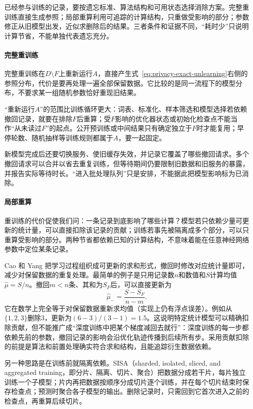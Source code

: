 已经参与训练的记录，要按遗忘标准、算法结构和可用状态选择消除方案。完整重训练直接生成参照；局部重算利用可追踪的计算结构，只重做受影响的部分；参数修正从旧模型出发，近似求删除后的结果。三者条件和证据不同，“耗时少”只说明计算节省，不能单独代表遗忘充分。

\paragraph{完整重训练}

完整重训练在$D\setminus F$上重新运行$A$，直接产生式~\eqref{eq:privacy-exact-unlearning}右侧的参照分布，代价是要再处理一遍全部保留数据。它比较的是同一流程下的模型分布，不要求某一组随机参数恰好重现旧结果。

“重新运行$A$”的范围比训练循环更大：词表、标准化、样本筛选和模型选择若依赖撤回记录，就要在排除$F$后重算；受$F$影响的优化器状态或初始化检查点不能当作“从未读过$F$”的起点。公开预训练或中间结果只有确定独立于$F$时才能复用；早停轮数、随机抽样等训练规则都属于$A$，要一起固定。

新模型完成后还要切换服务、使旧缓存失效，并记录它覆盖了哪些撤回请求。多个撤回请求可以合并以省去重复训练，但等待期间仍要限制旧数据和旧服务的暴露，并报告实际等待时长。“进入批处理队列”只是安排，不能据此把模型影响标为已消除。

\paragraph{局部重算}

重训练的代价促使我们问：一条记录到底影响了哪些计算？模型若只依赖少量可更新的统计量，可以直接扣除该记录的贡献；训练若事先被隔离成多个部分，可以只重算受影响的部分。两种节省都依赖已知的计算结构，不意味着能在任意神经网络参数中定位某条记录。

Cao 和 Yang 把学习过程组织成可更新的求和形式，撤回时修改对应统计量即可，减少对保留数据的重复处理。最简单的例子是只用记录数$n$和数值和$S$计算均值$\hat\mu=S/n$。撤回$m<n$条、其和为$S_F$后，可以直接更新为
\[
 \hat\mu_- =\frac{S-S_F}{n-m}.
\]
它在数学上完全等于对保留数据重新求均值（实现上仍有浮点误差）。例如从$\{1,2,3\}$删除3，更新为$(6-3)/(3-1)=1.5$。这说明特定统计模型可以精确扣除贡献，但不能推广成“深度训练中把某个梯度减回去就行”：深度训练的每一步都依赖先前的参数，撤回记录的影响会沿优化轨迹传播到后续所有步。采用贡献扣除的前提是算法和前置处理确实符合求和结构，且能追踪衍生数据依赖。

另一种思路是在训练前就隔离依赖。SISA（sharded, isolated, sliced, and aggregated training，即分片、隔离、切片、聚合）把数据分成若干片，每片独立训练一个子模型；片内再把数据按顺序分成切片逐个训练，并在每个切片结束时保存检查点；预测时聚合各子模型的输出。删除记录时，只需回到它首次进入之前的检查点，再重算后续切片。

